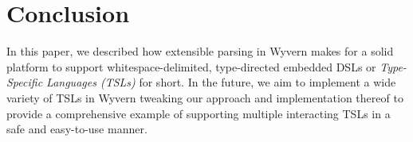 \section{Conclusion} %
\label{s:conclusion}

In this paper, we described how extensible parsing in Wyvern makes for
a solid platform to support whitespace-delimited, type-directed embedded DSLs or \textit{Type-Specific Languages (TSLs)} for short.
In the
future, we aim to implement a wide variety of TSLs in Wyvern tweaking
our approach and implementation thereof to provide a comprehensive example of
supporting multiple interacting TSLs in a safe and easy-to-use manner.



